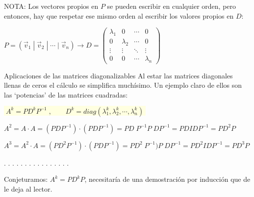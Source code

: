 NOTA: Los vectores propios en $P$ se pueden escribir en cualquier orden, pero entonces, hay que respetar ese mismo orden al escribir los valores propios en $D$: 

$P=\left( \vec v_1 \; | \; \vec v_2 \; | \; \cdots \; | \; \vec v_n \right) \longrightarrow D=\left( \begin{matrix} \lambda_1 &0&\cdots &0 \\ 0&\lambda_2&\cdots & 0 \\ \vdots & \vdots & \ddots & \vdots \\ 0&0&\cdots & \lambda_n \end{matrix} \right)$

\begin{teor}{Aplicaciones de las matrices diagonalizables}
Al estar las matrices diagonales llenas de ceros el cálculo se simplifica muchísimo. Un ejemplo claro de ellos son las `potencias' de las matrices cuadradas:

\vspace{4mm} \centerline{\colorbox{LightYellow}{$\; A^k=PD^kP^{-1} \; , \qquad D^k=diag(\lambda_1^k, \lambda_2^k, \cdots, \lambda_n^k)\; $	}}
\end{teor}
\begin{proofw}

\textcolor{gris}{\noindent $A^2=A\cdot A = (PDP^{-1})\cdot  (PDP^{-1})= PD\; P^{-1} P\; DP^{-1}=  PDIDP^{-1}=PD^2P$}

\noindent \textcolor{gris}{\noindent $A^3=A^2\cdot A= (PD^2P^{-1})\cdot (PDP^{-1})=PD^2\;P^{-1})P\; DP^{-1}=PD^2IDP^{-1}=PD^3P$}

\noindent \textcolor{gris}{\noindent . . . . . . . . . . . . . . . .}

\noindent \textcolor{gris}{\noindent Conjeturamos: $A^k=PD^kP$, necesitaría de una demostración por inducción que de le deja al lector.}
	
\end{proofw}
	



